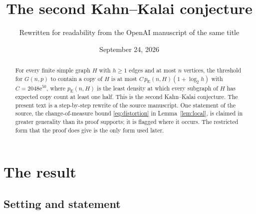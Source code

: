 \documentclass[11pt]{article}
\title{The second Kahn--Kalai conjecture}
\author{Rewritten for readability from the OpenAI manuscript of the same title}
\date{September 24, 2026}
\numberwithin{equation}{section}
\theoremstyle{remark}
\newcommand{\ee}{\mathrm e}
\begin{document}
\maketitle
\begin{abstract}
For every finite simple graph $H$ with $h\ge1$ edges and at most $n$
vertices, the threshold for $G(n,p)$ to contain a copy of $H$ is at most
$C\,p_{\mathrm E}(n,H)(1+\log_2 h)$ with $C=2048\ee^{50}$, where
$p_{\mathrm E}(n,H)$ is the least density at which every subgraph of $H$
has expected copy count at least one half. This is the second
Kahn--Kalai conjecture. The present text is a step-by-step rewrite of
the source manuscript. One statement of the source, the
change-of-measure bound \eqref{eq:distortion} in Lemma~\ref{lem:local},
is claimed in greater generality than its proof supports; it is flagged
where it occurs. The restricted form that the proof does give is the
only form used later.
\end{abstract}

\section{The result}\label{sec:introduction}

\subsection{Setting and statement}
\end{document}
